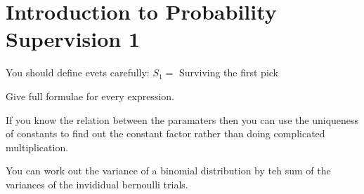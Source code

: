 \documentclass[10pt, a4paper]{article}
\begin{document}
\section*{Introduction to Probability Supervision 1}

You should define evets carefully: $S_1 = $ Surviving the first pick

Give full formulae for every expression.

If you know the relation between the paramaters then you can use the uniqueness of constants to find out the constant
 factor rather than doing complicated multiplication.

You can work out the variance of a binomial distribution by teh sum of the variances of the invididual bernoulli trials.
\end{document}
